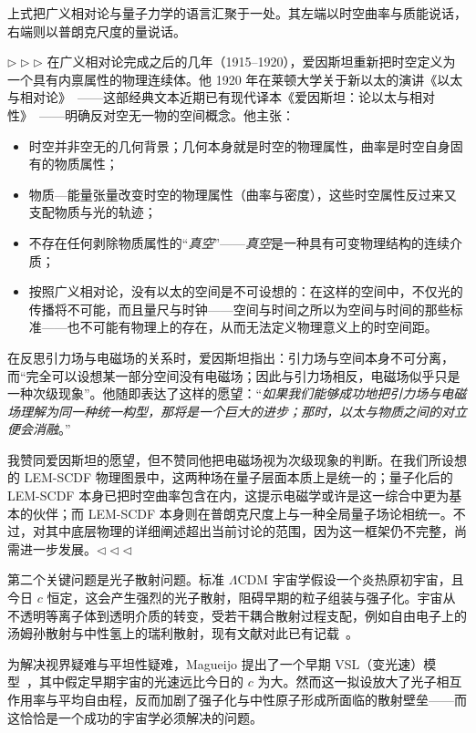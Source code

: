 \documentclass[12pt,leqno]{article}
\begin{document}
	\medskip
	上式把广义相对论与量子力学的语言汇聚于一处。其左端以时空曲率与质能说话，右端则以普朗克尺度的量说话。
	
	\bigskip
	\noindent
	$\triangleright \triangleright \triangleright$\enspace
	在广义相对论完成之后的几年（1915--1920），爱因斯坦重新把时空定义为一个具有内禀属性的物理连续体。他 1920 年在莱顿大学关于新以太的演讲《以太与相对论》~\cite{Einstein:1922ether}——这部经典文本近期已有现代译本《爱因斯坦：论以太与相对性》~\cite{LeidenLecture:2025}——明确反对空无一物的空间概念。他主张：
	\begin{itemize}
		\item 时空并非空无的几何背景；几何本身就是时空的物理属性，曲率是时空自身固有的物质属性；
		\item 物质—能量张量改变时空的物理属性（曲率与密度），这些时空属性反过来又支配物质与光的轨迹；
		\item 不存在任何剥除物质属性的“\textit{真空}”——\textit{真空}是一种具有可变物理结构的连续介质；
		\item 按照广义相对论，没有以太的空间是不可设想的：在这样的空间中，不仅光的传播将不可能，而且量尺与时钟——空间与时间之所以为空间与时间的那些标准——也不可能有物理上的存在，从而无法定义物理意义上的时空间距。
	\end{itemize}
	
	在反思引力场与电磁场的关系时，爱因斯坦指出：引力场与空间本身不可分离，而“完全可以设想某一部分空间没有电磁场；因此与引力场相反，电磁场似乎只是一种次级现象”。他随即表达了这样的愿望：“{\textit{如果我们能够成功地把引力场与电磁场理解为同一种统一构型，那将是一个巨大的进步；那时，以太与物质之间的对立便会消融}}。”
		
	\medskip
	我赞同爱因斯坦的愿望，但不赞同他把电磁场视为次级现象的判断。在我们所设想的 LEM-SCDF 物理图景中，这两种场在量子层面本质上是统一的；量子化后的 LEM-SCDF 本身已把时空曲率包含在内，这提示电磁学或许是这一综合中更为基本的伙伴；而 LEM-SCDF 本身则在普朗克尺度上与一种全局量子场论相统一。不过，对其中底层物理的详细阐述超出当前讨论的范围，因为这一框架仍不完整，尚需进一步发展。\enspace$\triangleleft \triangleleft \triangleleft$
	

	\bigskip
	第二个关键问题是光子散射问题。标准 \(\Lambda\)CDM 宇宙学假设一个炎热原初宇宙，且今日 \(c\) 恒定，这会产生强烈的光子散射，阻碍早期的粒子组装与强子化。宇宙从不透明等离子体到透明介质的转变，受若干耦合散射过程支配，例如自由电子上的汤姆孙散射与中性氢上的瑞利散射，现有文献对此已有记载~\cite{Coulton:2021}。
	
	\medskip
	为解决视界疑难与平坦性疑难，Magueijo 提出了一个早期 VSL（变光速）模型~\cite{Magueijo:2003}，其中假定早期宇宙的光速远比今日的 \(c\) 为大。然而这一拟设放大了光子相互作用率与平均自由程，反而加剧了强子化与中性原子形成所面临的散射壁垒——而这恰恰是一个成功的宇宙学必须解决的问题。
			
\end{document}
